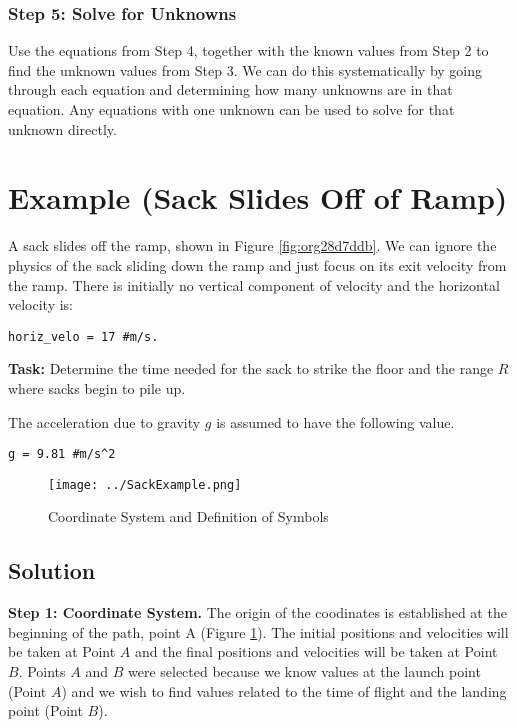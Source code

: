 \documentclass[11pt]{article}
\begin{document}
\subsubsection{Step 5: Solve for Unknowns}
\label{sec:org2d39b00}

Use the equations from Step 4, together with the known values from
Step 2 to find the unknown values from Step 3.  We can do this
systematically by going through each equation and determining how many
unknowns are in that equation.  Any equations with one unknown can be
used to solve for that unknown directly.

\section{Example (Sack Slides Off of Ramp)}
\label{sec:org5f089a8}

A sack slides off the ramp, shown in Figure \ref{fig:org28d7ddb}.  We can
ignore the physics of the sack sliding down the ramp and just focus on
its exit velocity from the ramp.  There is initially no vertical
component of velocity and the horizontal velocity is:

\begin{verbatim}
horiz_velo = 17 #m/s.
\end{verbatim}

\textbf{Task:} Determine the time needed for the sack to strike the floor and
the range \(R\) where sacks begin to pile up.

The acceleration due to gravity \(g\) is assumed to have the following
value.

\begin{verbatim}
g = 9.81 #m/s^2
\end{verbatim}

\begin{figure}[htbp]
\centering
\texttt{[image: ../SackExample.png]}
\caption{\label{fig:org09b09e3}Coordinate System and Definition of Symbols}
\end{figure}

\subsection{Solution}
\label{sec:org373689d}

\textbf{Step 1: Coordinate System.} The origin of the coodinates is
established at the beginning of the path, point A (Figure
\ref{fig:org09b09e3}).  The initial positions and velocities will be taken
at Point \(A\) and the final positions and velocities will be taken at
Point \(B\).  Points \(A\) and \(B\) were selected because we know values at
the launch point (Point \(A\)) and we wish to find values related to the
time of flight and the landing point (Point \(B\)).
\end{document}

